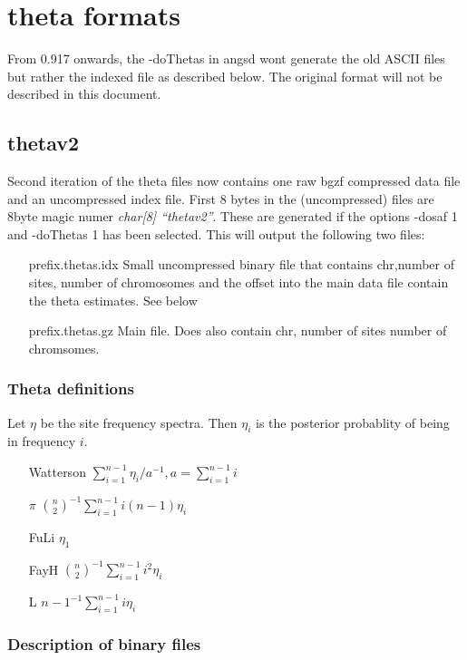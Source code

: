\documentclass[10pt]{article}
\begin{document}
\newpage
\section{theta formats}
From 0.917 onwards, the -doThetas in angsd wont generate the old ASCII files but rather the indexed file as described below. The original format will not be described in this document.\\


\subsection{thetav2}
Second iteration of the theta files now contains one raw bgzf compressed data file and an uncompressed index file. First 8 bytes in the (uncompressed) files are 8byte magic numer \emph{char[8] ``thetav2''}. These are generated if the options -dosaf 1 and -doThetas 1 has been selected. This will output the following two files:

\begin{itemize}
\item[prefix.thetas.idx] Small uncompressed binary file that contains chr,number of sites, number of chromosomes and the offset into the main data file contain the theta estimates. See below
\item[prefix.thetas.gz] Main file. Does also contain chr, number of sites number of chromsomes.
\end{itemize}

\subsubsection{Theta definitions}
Let $\eta$ be the site frequency spectra. Then $\eta_i$ is the posterior probablity of being in frequency $i$. 
\begin{itemize}
\item[Watterson] $\sum_{i=1}^{n-1}\eta_i/a^{-1}, a=\sum_{i=1}^{n-1}i$
\item[$\pi$] $ {{n}\choose{2}}^{-1}\sum_{i=1}^{n-1}i(n-1)\eta_i$
\item[FuLi] $\eta_1$
\item[FayH] $ {{n}\choose{2}}^{-1}\sum_{i=1}^{n-1}i^2\eta_i$ 
\item[L] $ {n-1}^{-1}\sum_{i=1}^{n-1}i\eta_i$ 
\end{itemize}

\subsubsection{Description of binary files}
\end{document}
